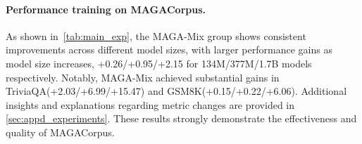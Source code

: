 \paragraph{Performance training on MAGACorpus.}
As shown in~\autoref{tab:main_exp}, the MAGA-Mix group shows consistent improvements across different model sizes,
with larger performance gains as model size increases, +0.26/+0.95/+2.15 for 134M/377M/1.7B models respectively.
Notably, MAGA-Mix achieved substantial gains in TriviaQA(+2.03/+6.99/+15.47) and GSM8K(+0.15/+0.22/+6.06).
Additional insights and explanations regarding metric changes are provided in \autoref{sec:appd_experiments}.
These results strongly demonstrate the effectiveness and quality of MAGACorpus.

\begin{table*}[h]
    \center
    \vspace{-1em}
    \setlength{\fboxsep}{1pt}
    \caption{Benchmark {\ours} with SOTA small LMs. Models of similar size are grouped.
    All results are obtained through \textsc{LightEval}~\citep{lighteval}.
    Best results in each group are highlighted in \textbf{bold}, the second in \underline{underline}, and in \colorbox{green!15}{green} for that MAGA-Mix wins under fair comparison.
    }
    \vspace{-0.5em}
    \renewcommand{\arraystretch}{1.15}
    \begin{adjustbox}{max width=\textwidth}

\end{adjustbox}
\end{table*}
